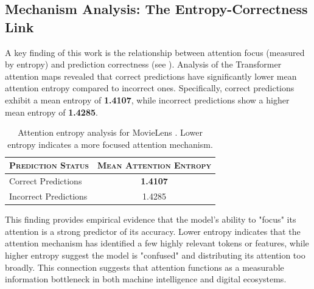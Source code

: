 \subsection{Mechanism Analysis: The Entropy-Correctness Link}
A key finding of this work is the relationship between attention focus (measured by entropy) and prediction correctness (see ). Analysis of the Transformer attention maps revealed that correct predictions have significantly lower mean attention entropy compared to incorrect ones. Specifically, correct predictions exhibit a mean entropy of {\bf 1.4107}, while incorrect predictions show a higher mean entropy of {\bf 1.4285}.

\begin{table}[h]
\centering
\caption{Attention entropy analysis for MovieLens \sectask. Lower entropy indicates a more focused attention mechanism.}
\label{tab:entropy_analysis}
\begin{tabular}{@{}lc@{}}
\toprule
\textsc{Prediction Status} & \textsc{Mean Attention Entropy} \\
\midrule
Correct Predictions & {\bf 1.4107} \\
Incorrect Predictions & 1.4285 \\
\bottomrule
\end{tabular}
\end{table}

This finding provides empirical evidence that the model's ability to "focus" its attention is a strong predictor of its accuracy. Lower entropy indicates that the attention mechanism has identified a few highly relevant tokens or features, while higher entropy suggest the model is "confused" and distributing its attention too broadly. This connection suggests that attention functions as a measurable information bottleneck in both machine intelligence and digital ecosystems.
